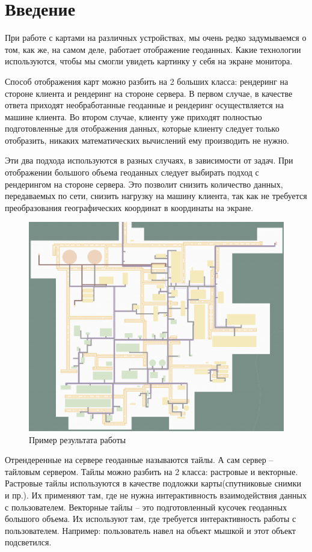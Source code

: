 \section*{\Large{Введение}}
При работе с картами на различных устройствах, мы очень редко задумываемся о том, как же, на самом деле,
работает отображение геоданных. Какие технологии используются, чтобы мы смогли увидеть картинку у себя на экране
монитора.

Способ отображения карт можно разбить на 2 больших класса: рендеринг на стороне клиента и рендеринг на стороне
сервера.
В первом случае, в качестве ответа приходят необработанные геоданные и рендеринг осуществляется на машине клиента.
Во втором случае, клиенту уже приходят полностью подготовленные для отображения данных,
которые клиенту следует только отобразить,
никаких математических вычислений ему производить не нужно.

Эти два подхода используются в разных случаях, в зависимости от задач.
При отображении большого объема геоданных следует выбирать подход с рендерингом
на стороне сервера. Это позволит снизить количество данных, передаваемых по сети, снизить нагрузку на
машину клиента, так как не требуется преобразования географических координат в координаты на экране.

\begin{figure}
    \begin{center}
        \includegraphics[width=\textwidth]{images/introduction/1}
    \end{center}
    \caption{Пример результата работы}
    \label{pic:problem__site-plan}
\end{figure}
Отрендеренные на сервере геоданные называются тайлы. А сам сервер -- тайловым сервером.
Тайлы можно разбить на 2 класса: растровые и векторные. Растровые тайлы используются в качестве
подложки карты(спутниковые снимки и пр.). Их применяют там, где не нужна интерактивность взаимодействия данных
с пользователем. Векторные тайлы -- это подготовленный кусочек геоданных большого объема. Их используют там, где
требуется интерактивность работы с пользователем. Например: пользователь навел на объект мышкой и этот объект подсветился.

